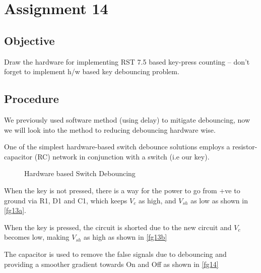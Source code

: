 \documentclass[a4paper]{article} %
\begin{document}
\section[Hardware Debouncing]{Assignment 14} %
    \subsection{Objective}
        Draw the hardware for implementing RST 7.5 based key-press counting -- don't forget to implement h/w based key debouncing problem.
    \subsection{Procedure}
        We previously used software method (using delay) to mitigate debouncing, now we will look into the method to reducing debouncing hardware wise.\par
        One of the simplest hardware-based switch debounce solutions employs a resistor-capacitor (RC) network in conjunction with a switch (i.e our key).

        \begin{figure}[h!]
            \centering
            \caption{Hardware based Switch Debouncing}
            \label{fg12}
        \end{figure}

        When the key is not pressed, there is a way for the power to go from +ve to ground via R1, D1 and C1, which keeps $V_c$ as high, and $V_{sh}$ as low as shown in \ref{fg13a}.\par
        When the key is pressed, the circuit is shorted due to the new circuit and $V_c$ becomes low, making $V_{sh}$ as high as shown in \ref{fg13b}\par
        The capacitor is used to remove the false signals due to debouncing and providing a smoother gradient towards On and Off as shown in \ref{fg14}
\end{document}
